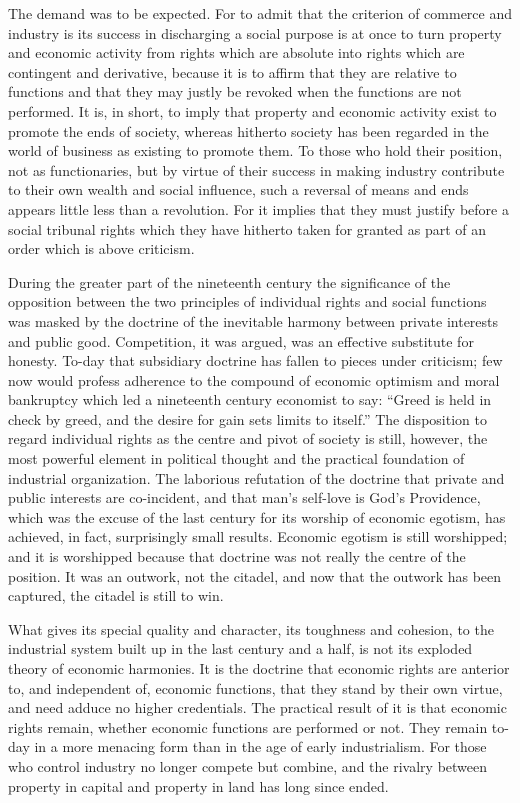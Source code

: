 \documentclass{book}
\begin{document}
The demand was to be expected. For to admit that the criterion of commerce and industry is its success in discharging a social purpose is at once to turn property and economic activity from rights which are absolute into rights which are contingent and derivative, because it is to affirm that they are relative to functions and that they may justly be revoked when the functions are not performed. It is, in short, to imply that property and economic activity exist to promote the ends of society, whereas hitherto society has been regarded in the world of business as existing to promote them. To those who hold their position, not as functionaries, but by virtue of their success in making industry contribute to their own wealth and social influence, such a reversal of means and ends appears little less than a revolution. For it implies that they must justify before a social tribunal rights which they have hitherto taken for granted as part of an order which is above criticism.

During the greater part of the nineteenth century the significance of the opposition between the two principles of individual rights and social functions was masked by the doctrine of the inevitable harmony between private interests and public good. Competition, it was argued, was an effective substitute for honesty. To-day that subsidiary doctrine has fallen to pieces under criticism; few now would profess adherence to the compound of economic optimism and moral bankruptcy which led a nineteenth century economist to say: “Greed is held in check by greed, and the desire for gain sets limits to itself.” The disposition to regard individual rights as the centre and pivot of society is still, however, the most powerful element in political thought and the practical foundation of industrial organization. The laborious refutation of the doctrine that private and public interests are co-incident, and that man’s self-love is God’s Providence, which was the excuse of the last century for its worship of economic egotism, has achieved, in fact, surprisingly small results. Economic egotism is still worshipped; and it is worshipped because that doctrine was not really the centre of the position. It was an outwork, not the citadel, and now that the outwork has been captured, the citadel is still to win.

What gives its special quality and character, its toughness and cohesion, to the industrial system built up in the last century and a half, is not its exploded theory of economic harmonies. It is the doctrine that economic rights are anterior to, and independent of, economic functions, that they stand by their own virtue, and need adduce no higher credentials. The practical result of it is that economic rights remain, whether economic functions are performed or not. They remain to-day in a more menacing form than in the age of early industrialism. For those who control industry no longer compete but combine, and the rivalry between property in capital and property in land has long since ended.
\end{document}
